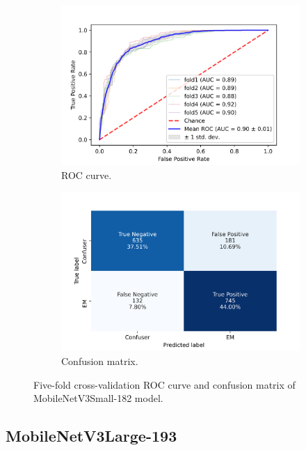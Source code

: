 \begin{figure}[h!]
	\centering
	\begin{subfigure}[b]{0.49\textwidth}
		\centering
		\includegraphics[width=\textwidth,keepaspectratio]{images/Supplement4/image150.png}
		\caption{ROC curve.}
	\end{subfigure}
	\hfill
	\begin{subfigure}[b]{0.49\textwidth}
		\centering
		\includegraphics[width=\textwidth,keepaspectratio]{images/Supplement4/image156.png}
		\caption{Confusion matrix.}
	\end{subfigure}
	\caption{Five-fold cross-validation ROC curve and confusion matrix of MobileNetV3Small-182 model.}
\end{figure}

\vfill\clearpage
\subsection{MobileNetV3Large-193}

